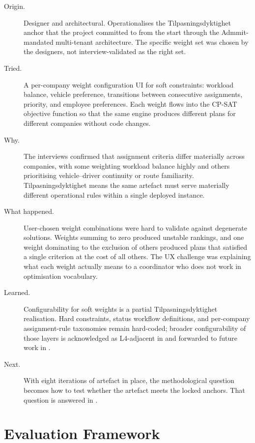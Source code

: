 \begin{description}
  \item[Origin.] Designer and architectural. Operationalises the Tilpasningsdyktighet anchor that the project committed to from the start through the Admmit-mandated multi-tenant architecture. The specific weight set was chosen by the designers, not interview-validated as the right set.
  \item[Tried.] A per-company weight configuration UI for soft constraints: workload balance, vehicle preference, transitions between consecutive assignments, priority, and employee preferences. Each weight flows into the CP-SAT objective function so that the same engine produces different plans for different companies without code changes.
  \item[Why.] The interviews confirmed that assignment criteria differ materially across companies, with some weighting workload balance highly and others prioritising vehicle--driver continuity or route familiarity. Tilpasningsdyktighet means the same artefact must serve materially different operational rules within a single deployed instance.
  \item[What happened.] User-chosen weight combinations were hard to validate against degenerate solutions. Weights summing to zero produced unstable rankings, and one weight dominating to the exclusion of others produced plans that satisfied a single criterion at the cost of all others. The UX challenge was explaining what each weight actually means to a coordinator who does not work in optimisation vocabulary.
  \item[Learned.] Configurability for soft weights is a partial Tilpasningsdyktighet realisation. Hard constraints, status workflow definitions, and per-company assignment-rule taxonomies remain hard-coded; broader configurability of those layers is acknowledged as L4-adjacent in  and forwarded to future work in .
  \item[Next.] With eight iterations of artefact in place, the methodological question becomes how to test whether the artefact meets the locked anchors. That question is answered in .
\end{description}


\section{Evaluation Framework}
\label{sec:evaluation-framework}

